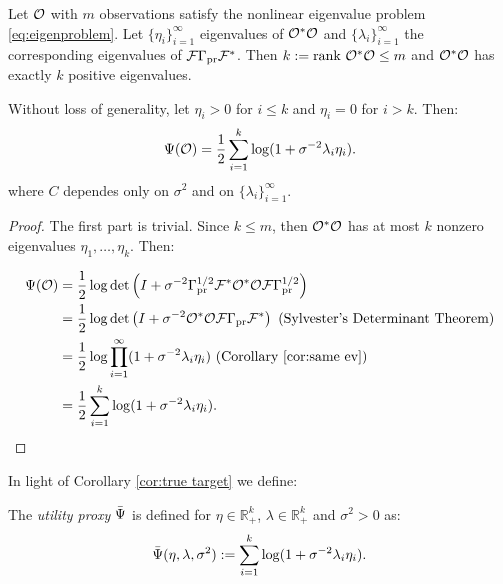 \documentclass{amsart}
\numberwithin{equation}{section}
\begin{document}
\begin{corollary}\label{cor:true target}
  Let $\mathcal{O}$ with $m$ observations satisfy the nonlinear eigenvalue
  problem \eqref{eq:eigenproblem}. Let $\{\eta_i\}_{i=1}^{\infty}$
  eigenvalues of $\mathcal{O}^*\mathcal{O}$ and $\{\lambda_i\}_{i=1}^{\infty}$ the
  corresponding eigenvalues of $\mathcal{F} \Gamma_{\textup{pr}} \mathcal{F}^*$. Then $k:=\textup{rank}\ 
  \mathcal{O}^*\mathcal{O} \leq m$ and $\mathcal{O}^*\mathcal{O}$ has exactly $k$ positive
  eigenvalues.

  Without loss of generality, let $\eta_i > 0$ for $i\leq k$ and
  $\eta_i = 0$ for $i > k$. Then:
  \begin{equation*}
    \Psi(\mathcal{O}) = \frac12 \sum_{i=1}^{k} \log (1 + \sigma^{-2}\lambda_i\eta_i).
  \end{equation*}
  where $C$ dependes only on $\sigma^2$ and on
  $\{\lambda_i\}_{i=1}^{\infty}$.
 
\end{corollary}
\begin{proof}
  The first part is trivial. Since $k \leq m$, then $\mathcal{O}^*\mathcal{O}$ has
  at most $k$ nonzero eigenvalues $\eta_1, \dots, \eta_k$. Then:
  
  \begin{align}
    \begin{split}
      \tar(\obs) &= \frac12\log \det \left (I + \sigma^{-2} \prcov^{1/2} \fwd ^* \obs^*
      \obs \fwd \prcov^{1/2}\right )\\%
      &= \frac12 \log \det \left (I + \sigma^{-2} \obs^* \obs \fwd
      \prcov\fwd^* \right ) \text{ (Sylvester's Determinant
      Theorem)}\\
      &=\frac12 \log \prod_{i=1}^{\infty} ( 1 + \sigma^{-2} \lambda_i\eta_i ) \text{ (Corollary \ref{cor:same ev})} \\
      &=\frac12 \sum_{i=1}^{k} \log (1 + \sigma^{-2}\lambda_i\eta_i).
    \end{split}
  \end{align}
\end{proof}

In light of Corollary \ref{cor:true target} we define:
\begin{definition}
  The \emph{utility proxy} $\bar{\Psi}$ is defined for $\eta \in
  \mathbb{R}_+^k$, $\lambda \in \mathbb{R}_+^k$ and $\sigma^2 >0$ as:
  \begin{equation*}
    \bar{\Psi}(\eta, \lambda, \sigma^2) := \sum_{i=1}^k \log(1 + \sigma^{-2}\lambda_i\eta_i).
  \end{equation*}
\end{definition}
\end{document}
